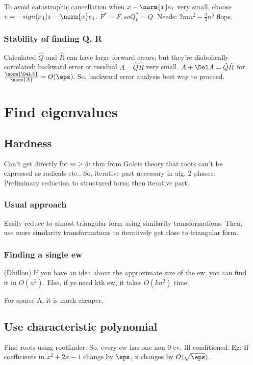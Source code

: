 \documentclass[oneside, article]{memoir}
\begin{document}
To avoid catastrophic cancellation when $x - \norm{x}e_{1}$ very small, choose $v = -sign(x_{1})x - \norm{x}e_{1}$. $F^{*} = F, so Q_{k}^{*}=Q$. Needs: $2mn^{2} - \frac{2}{3}n^{3}$ flops.

\subsection{Stability of finding Q, R}
Calculated $\hat{Q}$ and $\hat{R}$ can have large forward errors; but they're diabolically correlated; backward error or residual $A -\hat{Q}\hat{R}$ very small. $A + \Del A = \hat{Q}\hat{R}$ for $\frac{\norm{\Del A}}{\norm{A}} = O(\eps)$. So, backward error analysis best way to proceed.



\chapter{Find eigenvalues}
\section{Hardness}
Can't get directly for $m\geq 5$: thm from Galois theory that roots can't be expressed as radicals etc.. So, iterative part necessary in alg. 2 phases: Preliminary reduction to structured form; then iterative part.

\subsection{Usual approach}
Easily reduce to almost-triangular form using similarity transformations. Then, use more similarity transformations to iteratively get close to triangular form.

\subsection{Finding a single ew}
(Dhillon) If you have an idea about the approximate size of the ew, you can find it in $O(n^{2})$. Else, if ye need kth ew, it takes $O(kn^{2})$ time.

For sparse A, it is much cheaper. \tbc

\section{Use characteristic polynomial}
Find roots using rootfinder. So, every ew has one non 0 ev. Ill conditioned. Eg: If coefficients in $x^{2}+2x-1$ change by $\eps$, x changes by $O(\sqrt{\eps})$.
\end{document}
